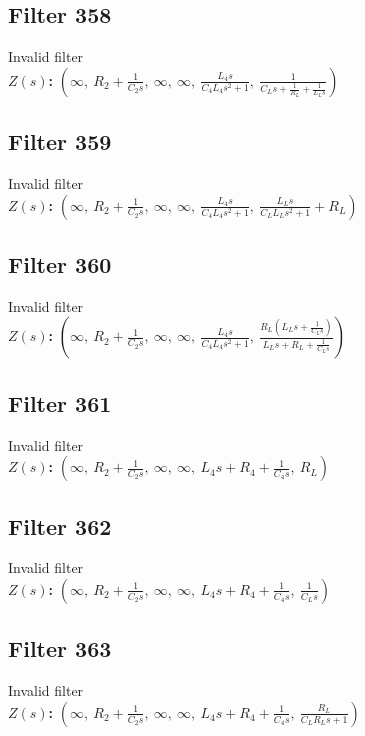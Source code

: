 \documentclass{article}
\begin{document}
\subsection*{Filter 358}
Invalid filter \\ 
\textbf{$Z(s)$:} $\left( \infty, \  R_{2} + \frac{1}{C_{2} s}, \  \infty, \  \infty, \  \frac{L_{4} s}{C_{4} L_{4} s^{2} + 1}, \  \frac{1}{C_{L} s + \frac{1}{R_{L}} + \frac{1}{L_{L} s}}\right)$ \\ 
\subsection*{Filter 359}
Invalid filter \\ 
\textbf{$Z(s)$:} $\left( \infty, \  R_{2} + \frac{1}{C_{2} s}, \  \infty, \  \infty, \  \frac{L_{4} s}{C_{4} L_{4} s^{2} + 1}, \  \frac{L_{L} s}{C_{L} L_{L} s^{2} + 1} + R_{L}\right)$ \\ 
\subsection*{Filter 360}
Invalid filter \\ 
\textbf{$Z(s)$:} $\left( \infty, \  R_{2} + \frac{1}{C_{2} s}, \  \infty, \  \infty, \  \frac{L_{4} s}{C_{4} L_{4} s^{2} + 1}, \  \frac{R_{L} \left(L_{L} s + \frac{1}{C_{L} s}\right)}{L_{L} s + R_{L} + \frac{1}{C_{L} s}}\right)$ \\ 
\subsection*{Filter 361}
Invalid filter \\ 
\textbf{$Z(s)$:} $\left( \infty, \  R_{2} + \frac{1}{C_{2} s}, \  \infty, \  \infty, \  L_{4} s + R_{4} + \frac{1}{C_{4} s}, \  R_{L}\right)$ \\ 
\subsection*{Filter 362}
Invalid filter \\ 
\textbf{$Z(s)$:} $\left( \infty, \  R_{2} + \frac{1}{C_{2} s}, \  \infty, \  \infty, \  L_{4} s + R_{4} + \frac{1}{C_{4} s}, \  \frac{1}{C_{L} s}\right)$ \\ 
\subsection*{Filter 363}
Invalid filter \\ 
\textbf{$Z(s)$:} $\left( \infty, \  R_{2} + \frac{1}{C_{2} s}, \  \infty, \  \infty, \  L_{4} s + R_{4} + \frac{1}{C_{4} s}, \  \frac{R_{L}}{C_{L} R_{L} s + 1}\right)$ \\ 
\end{document}
